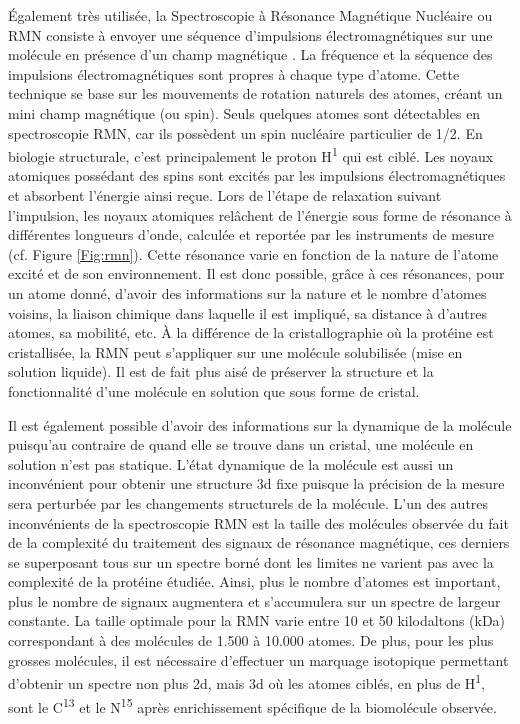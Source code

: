 Également très utilisée, la Spectroscopie à Résonance Magnétique Nucléaire ou RMN consiste à envoyer une séquence d'impulsions électromagnétiques sur une molécule en présence d'un champ magnétique \cite{wuthrich1986nmr}. La fréquence et la séquence des impulsions électromagnétiques sont propres à chaque type d'atome. Cette technique se base sur les mouvements de rotation naturels des atomes, créant un mini champ magnétique (ou spin). Seuls quelques atomes sont détectables en spectroscopie RMN, car ils possèdent un spin nucléaire particulier de 1/2. En biologie structurale, c'est principalement le proton H\textsuperscript{1} qui est ciblé. Les noyaux atomiques possédant des spins sont excités par les impulsions électromagnétiques et absorbent l'énergie ainsi reçue. Lors de l'étape de relaxation suivant l'impulsion, les noyaux atomiques relâchent de l'énergie sous forme de résonance à différentes longueurs d'onde, calculée et reportée par les instruments de mesure (cf. Figure \ref{Fig:rmn}). Cette résonance varie en fonction de la nature de l'atome excité et de son environnement. Il est donc possible, grâce à ces résonances, pour un atome donné, d'avoir des informations sur la nature et le nombre d'atomes voisins, la liaison chimique dans laquelle il est impliqué, sa distance à d'autres atomes, sa mobilité, etc. À la différence de la cristallographie où la protéine est cristallisée, la RMN peut s'appliquer sur une molécule solubilisée (mise en solution liquide). Il est de fait plus aisé de préserver la structure et la fonctionnalité d'une molécule en solution que sous forme de cristal. 

Il est également possible d'avoir des informations sur la dynamique de la molécule puisqu'au contraire de quand elle se trouve dans un cristal, une molécule en solution n'est pas statique.
L'état dynamique de la molécule est aussi un inconvénient pour obtenir une structure 3d fixe puisque la précision de la mesure sera perturbée par les changements structurels de la molécule. L'un des autres inconvénients de la spectroscopie RMN est la taille des molécules observée du fait de la complexité du traitement des signaux de résonance magnétique, ces derniers se superposant tous sur un spectre borné dont les limites ne varient pas avec la complexité de la protéine étudiée. Ainsi, plus le nombre d'atomes est important, plus le nombre de signaux augmentera et s'accumulera sur un spectre de largeur constante. La taille optimale pour la RMN varie entre 10 et 50 kilodaltons (kDa) correspondant à des molécules de 1.500 à 10.000 atomes. De plus, pour les plus grosses molécules, il est nécessaire d'effectuer un marquage isotopique permettant d'obtenir un spectre non plus 2d, mais 3d où les atomes ciblés, en plus de H\textsuperscript{1}, sont le C\textsuperscript{13} et le N\textsuperscript{15} après enrichissement spécifique de la biomolécule observée.

